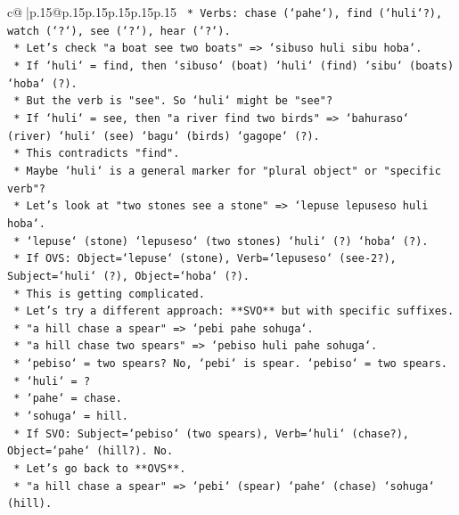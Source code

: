\documentclass{article}
\begin{document}
{\begin{supertabular}{c@{$\;$}|p{.15\linewidth}@{}p{.15\linewidth}p{.15\linewidth}p{.15\linewidth}p{.15\linewidth}p{.15\linewidth}}
{{{\texttt{        *   Verbs: chase (`pahe`), find (`huli`?), watch (`?`), see (`?`), hear (`?`).} \\
\texttt{        *   Let's check "a boat see two boats" => `sibuso huli sibu hoba`.} \\
\texttt{            *   If `huli` = find, then `sibuso` (boat) `huli` (find) `sibu` (boats) `hoba` (?).} \\
\texttt{            *   But the verb is "see". So `huli` might be "see"?} \\
\texttt{            *   If `huli` = see, then "a river find two birds" => `bahuraso` (river) `huli` (see) `bagu` (birds) `gagope` (?).} \\
\texttt{            *   This contradicts "find".} \\
\texttt{            *   Maybe `huli` is a general marker for "plural object" or "specific verb"?} \\
\texttt{            *   Let's look at "two stones see a stone" => `lepuse lepuseso huli hoba`.} \\
\texttt{                *   `lepuse` (stone) `lepuseso` (two stones) `huli` (?) `hoba` (?).} \\
\texttt{                *   If OVS: Object=`lepuse` (stone), Verb=`lepuseso` (see{-}2?), Subject=`huli` (?), Object=`hoba` (?).} \\
\texttt{                *   This is getting complicated.} \\
\texttt{        *   Let's try a different approach: **SVO** but with specific suffixes.} \\
\texttt{            *   "a hill chase a spear" => `pebi pahe sohuga`.} \\
\texttt{            *   "a hill chase two spears" => `pebiso huli pahe sohuga`.} \\
\texttt{                *   `pebiso` = two spears? No, `pebi` is spear. `pebiso` = two spears.} \\
\texttt{                *   `huli` = ?} \\
\texttt{                *   `pahe` = chase.} \\
\texttt{                *   `sohuga` = hill.} \\
\texttt{                *   If SVO: Subject=`pebiso` (two spears), Verb=`huli` (chase?), Object=`pahe` (hill?). No.} \\
\texttt{            *   Let's go back to **OVS**.} \\
\texttt{                *   "a hill chase a spear" => `pebi` (spear) `pahe` (chase) `sohuga` (hill).} \\
}}}
\end{supertabular}}
\end{document}
